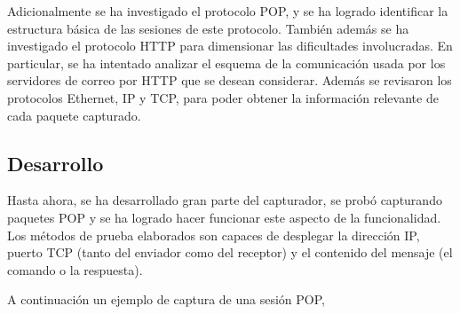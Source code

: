 \documentclass[titlepage]{article}
\begin{document}
Adicionalmente se ha investigado el protocolo POP, y se ha logrado identificar
la estructura b\'asica de las sesiones de este protocolo. Tambi\'en adem\'as
se ha investigado  el protocolo HTTP para dimensionar las dificultades
involucradas. En particular, se ha intentado analizar el esquema de la
comunicaci\'on usada por los servidores de correo por HTTP que se desean
considerar. Adem\'as se revisaron los protocolos Ethernet, IP y TCP, para
poder obtener la informaci\'on relevante de cada paquete capturado.

\subsection{Desarrollo}

Hasta ahora, se ha desarrollado gran parte del capturador, se prob\'o
capturando paquetes POP y se ha logrado hacer funcionar este aspecto de la
funcionalidad. Los m\'etodos de prueba elaborados son capaces de desplegar la
direcci\'on IP, puerto TCP (tanto del enviador como del receptor) y el
contenido del mensaje (el comando o la respuesta).

A continuaci\'on un ejemplo de captura de una sesi\'on POP,
\end{document}
